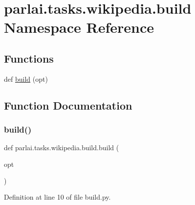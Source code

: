 \hypertarget{namespaceparlai_1_1tasks_1_1wikipedia_1_1build}{}\section{parlai.\+tasks.\+wikipedia.\+build Namespace Reference}
\label{namespaceparlai_1_1tasks_1_1wikipedia_1_1build}
\subsection*{Functions}
\begin{DoxyCompactItemize}
\item 
def \hyperlink{namespaceparlai_1_1tasks_1_1wikipedia_1_1build_acde71d9e655ae07210227d5bf00e77a0}{build} (opt)
\end{DoxyCompactItemize}


\subsection{Function Documentation}
\mbox{\label{namespaceparlai_1_1tasks_1_1wikipedia_1_1build_acde71d9e655ae07210227d5bf00e77a0}} 
\subsubsection{\texorpdfstring{build()}{build()}}
{\footnotesize\ttfamily def parlai.\+tasks.\+wikipedia.\+build.\+build (\begin{DoxyParamCaption}\item[{}]{opt }\end{DoxyParamCaption})}



Definition at line 10 of file build.\+py.

